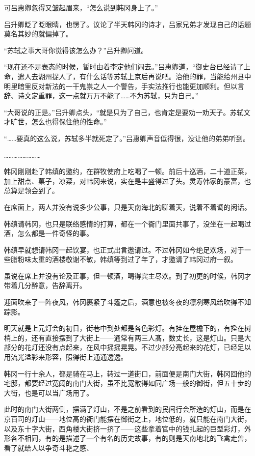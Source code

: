 可吕惠卿忽得又皱起眉来，“怎么说到韩冈身上了。”

吕升卿眨了眨眼睛，也愣了。议论了半天韩冈的诗才，吕家兄弟才发现自己的话题莫名其妙的就偏掉了。

“苏轼之事大哥你觉得该怎么办？”吕升卿问道。

“现在还不是表态的时候，暂时由着李定他们闹去。”吕惠卿道，“御史台已经请了上命，遣人去湖州捉人了，有什么话等苏轼上京后再说吧。治他的罪，当能给州县中明里暗里反对新法的一干鬼祟之人一个警告，手实法推行也能更加顺利。但以言辞、诗文定重罪，这一点就万万不能了……不为苏轼，只为自己。”

“大哥说的正是。”吕升卿点头，“就是只为了自己，也肯定是要劝一劝天子。苏轼文才旷世，怎么也得保住他的性命。”

“……要真的这么说，苏轼多半就死定了。”吕惠卿声音低得很，没让他的弟弟听到。

……………………

韩冈刚刚赴了韩缜的邀约，在群牧使府上吃喝了一顿。前后十巡酒，二十道正菜，加上甜点、菓子，凉菜，对韩冈来说，实在是丰盛得过了头。灵寿韩家的豪富，也总算是领会到了。

在席面上，两人并没有说多少公事，只是天南海北的聊着天，说着不着调的闲话。

韩缜请韩冈，也只是联络感情的打算，都在一个衙门里面共事了，没坐在一起喝过酒，怎么都是一件奇怪的事。

韩缜早就想请韩冈一起饮宴，也正式出言邀请过。不过韩冈如今绝足欢场，对于一些脂粉味太重的酒楼敬谢不敏，韩缜等到过了年了，才邀请了韩冈过府一叙。

虽说在席上并没有论及正事，但一顿酒，喝得宾主尽欢。到了初更的时候，韩冈才带着几分醉意，告辞离开。

迎面吹来了一阵夜风，韩冈裹紧了斗篷之后，酒意也被冬夜的凛冽寒风给吹得不知踪影。

明天就是上元灯会的初日，街巷中到处都是各色彩灯。有挂在屋檐下的，有拴在树梢上的，还有直接摆到了大街上——通常有两三人髙，数丈长，这是灯山。只是大部分的花灯还没有点起来，在风中摇摇晃晃。不过少部分亮起来的花灯，已经足以用流光溢彩来形容，照得街上通通透透。

韩冈一行十余人，都是骑在马上，转过一道街口，前面便是南门大街，韩冈回他的宅邸，都要经过宽阔的南门大街，虽不比宽敞得如同广场一般的御街，但五十步的大街，也是可以当广场用了。

此时的南门大街两侧，摆满了灯山，不是之前看到的民间行会所造的灯山，而是在京百司的灯山——地位高的衙门能摆在御街之上，地位低的，就只能在南门大街，以及东十字大街，西角楼大街挤一挤了——这些拿着官中的钱扎起的巨型彩灯，外形各不相同，有的是描述了一个有名的历史故事，有的则是天南地北的飞禽走兽，看了就给人以争奇斗艳之感、

